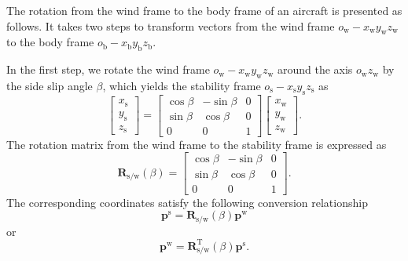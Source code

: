 The rotation from the wind frame to the body frame of an aircraft
is presented as follows. It takes two steps to transform vectors from
the wind frame ${{o}_{\text{w}}}-{{x}_{\text{w}}}{{y}_{\text{w}}}{{z}_{\text{w}}}$
to the body frame ${{o}_{\text{b}}}-{{x}_{\text{b}}}{{y}_{\text{b}}}{{z}_{\text{b}}}$. 

In the first step, we rotate the wind frame ${{o}_{\text{w}}}-{{x}_{\text{w}}}{{y}_{\text{w}}}{{z}_{\text{w}}}$
around the axis ${{o}_{\text{w}}}{{z}_{\text{w}}}$ by the side slip
angle $\beta$, which yields the stability frame ${{o}_{\text{s}}}-{{x}_{\text{s}}}{{y}_{\text{s}}}{{z}_{\text{s}}}$
as
\begin{equation}
\left[\begin{array}{l}
{x_{\text{s}}}\\
{y_{\text{s}}}\\
{z_{\text{s}}}
\end{array}\right]=\left[{\begin{array}{ccc}
	{\cos\beta} & {-\sin\beta} & 0\\
	{\sin\beta} & {\cos\beta} & 0\\
	0 & 0 & 1
	\end{array}}\right]\left[{\begin{array}{c}
	{x_{\text{w}}}\\
	{y_{\text{w}}}\\
	{z_{\text{w}}}
	\end{array}}\right].\label{eq:2.17}
\end{equation}
The rotation matrix from the wind frame to the stability frame is expressed as
\begin{equation}
{{\mathbf{R}}_{\text{{s}/{w}}}}\left(\beta\right)=\left[\begin{array}{ccc}
\cos\beta & -\sin\beta & 0\\
\sin\beta & \cos\beta & 0\\
0 & 0 & 1
\end{array}\right].\label{eq:2.18}
\end{equation}
The corresponding coordinates satisfy the following conversion relationship
\begin{equation}
{{\mathbf{p}}^{\text{s}}}={{\mathbf{R}}_{\text{s/w}}}\left(\beta\right){{\mathbf{p}}^{\text{w}}}\label{eq:2.19}
\end{equation}
or
\begin{equation}
{{\mathbf{p}}^{\text{w}}}=\mathbf{R}_{\text{s/w}}^{\text{T}}\left(\beta\right){{\mathbf{p}}^{\text{s}}}.\label{eq:2.20}
\end{equation}

